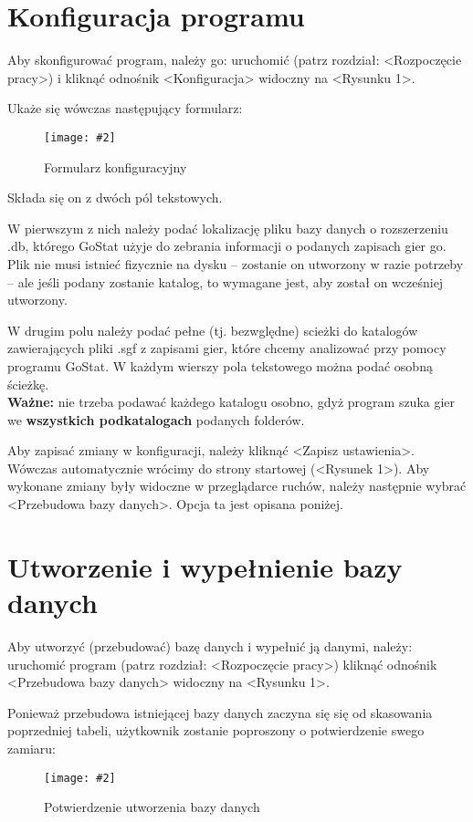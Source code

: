 \documentclass[10pt,leqno]{article}
\newcommand{\myimage}[3]{
  \begin{figure}[h!]
    \centering
      \texttt{[image: \#2]}
  \caption{#3}
  \end{figure}
}
\begin{document}
\newpage

\section{Konfiguracja programu}
Aby skonfigurować program, należy go: uruchomić (patrz rozdział: <Rozpoczęcie pracy>) i kliknąć odnośnik <Konfiguracja> widoczny na <Rysunku 1>.

Ukaże się wówczas następujący formularz:

\myimage{0.4}{formularz.png}{Formularz konfiguracyjny}

Składa się on z dwóch pól tekstowych. 

W pierwszym z nich należy podać lokalizację pliku bazy danych o rozszerzeniu .db, którego GoStat użyje do zebrania informacji o podanych zapisach gier go.
Plik nie musi istnieć fizycznie na dysku -- zostanie on utworzony w razie potrzeby -- ale jeśli podany zostanie katalog, to wymagane jest, aby został on
wcześniej utworzony.

W drugim polu należy podać pełne (tj. bezwględne) scieżki do katalogów zawierających pliki .sgf z zapisami gier, które chcemy analizować przy pomocy
programu GoStat. W każdym wierszy pola tekstowego można podać osobną ścieżkę. \\
\textbf{Ważne:} nie trzeba podawać każdego katalogu osobno, gdyż program szuka gier we \textbf{wszystkich podkatalogach} podanych folderów.

Aby zapisać zmiany w konfiguracji, należy kliknąć <Zapisz ustawienia>. Wówczas automatycznie wrócimy do strony startowej (<Rysunek 1>). 
Aby wykonane zmiany były widoczne w przeglądarce ruchów, należy następnie wybrać <Przebudowa bazy danych>. Opcja ta jest opisana poniżej.

\newpage

\section{Utworzenie i wypełnienie bazy danych}
Aby utworzyć (przebudować) bazę danych i wypełnić ją danymi, należy: 
  uruchomić program (patrz rozdział: <Rozpoczęcie pracy>)
  kliknąć odnośnik <Przebudowa bazy danych> widoczny na <Rysunku 1>.

Ponieważ przebudowa istniejącej bazy danych zaczyna się się od skasowania poprzedniej tabeli, użytkownik zostanie
poproszony o potwierdzenie swego zamiaru:

\myimage{1.0}{potwierdzenie.png}{Potwierdzenie utworzenia bazy danych}
\end{document}
